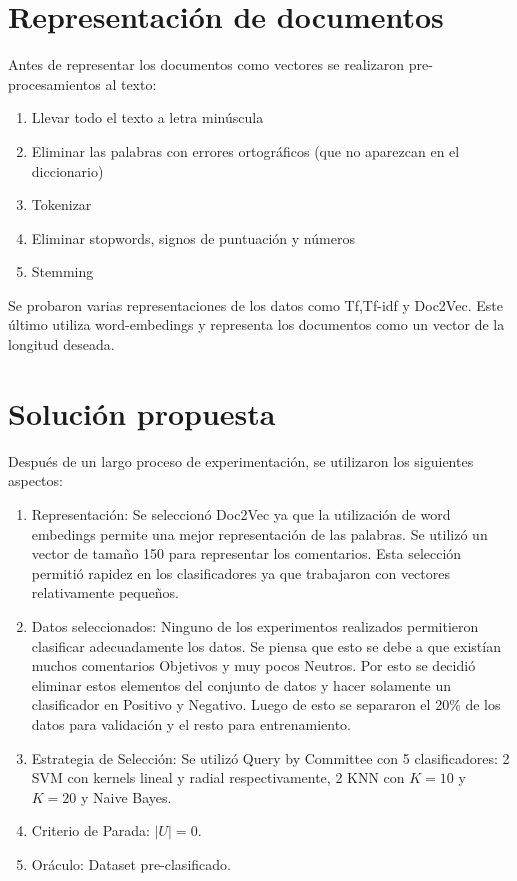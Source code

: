 \documentclass[]{article}
\begin{document}
\section{Representación de documentos}

Antes de representar los documentos como vectores se realizaron pre-procesamientos al texto:

\begin{enumerate}
    \item Llevar todo el texto a letra minúscula
    \item Eliminar las palabras con errores ortográficos (que no aparezcan en el diccionario)
    \item Tokenizar
    \item Eliminar stopwords, signos de puntuación y números
    \item Stemming
\end{enumerate}

Se probaron varias representaciones de los datos como Tf,Tf-idf y Doc2Vec. Este último utiliza word-embedings y representa los documentos como un vector de la longitud deseada.

\section{Solución propuesta}


Después de un largo proceso de experimentación, se utilizaron los siguientes aspectos:

\begin{enumerate}
    \item Representación: Se seleccionó Doc2Vec ya que la utilización de word embedings permite una mejor representación de las palabras. Se utilizó un vector de tamaño 150 para representar los comentarios. Esta selección permitió rapidez en los clasificadores ya que trabajaron con vectores relativamente pequeños.
    \item Datos seleccionados: Ninguno de los experimentos realizados permitieron clasificar adecuadamente los datos. Se piensa que esto se debe a que existían muchos comentarios Objetivos y muy pocos Neutros. Por esto se decidió eliminar estos elementos del conjunto de datos y hacer solamente un clasificador en Positivo y Negativo. Luego de esto se separaron el 20\% de los datos para validación y el resto para entrenamiento.
    \item Estrategia de Selección: Se utilizó Query by Committee con 5 clasificadores: 2 SVM con kernels lineal y radial respectivamente, 2 KNN con $K= 10$ y $K=20$ y  Naive Bayes.
    \item Criterio de Parada: $|U| = 0$.
    \item Oráculo: Dataset pre-clasificado.
\end{enumerate}
\end{document}
